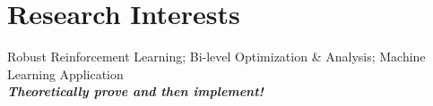 \section{Research Interests}
    \quad Robust Reinforcement Learning; Bi-level Optimization \& Analysis; Machine Learning Application\\
    \quad \textit{\textbf{Theoretically prove and then implement!}}
    
